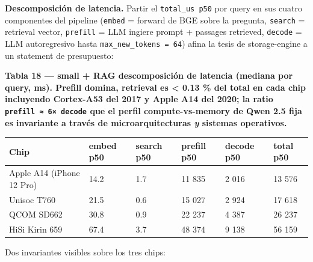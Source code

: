 \textbf{Descomposición de latencia.} Partir el \texttt{total\_us\ p50} por query
en sus cuatro componentes del pipeline (\texttt{embed} = forward de BGE sobre la
pregunta, \texttt{search} = retrieval vector, \texttt{prefill} = LLM ingiere
prompt + passages retrieved, \texttt{decode} = LLM autoregresivo hasta
\texttt{max\_new\_tokens\ =\ 64}) afina la tesis de storage-engine a un
statement de presupuesto:

\textbf{Tabla 18 --- small + RAG descomposición de latencia (mediana por query,
ms). Prefill domina, retrieval es \textless{} 0.13 \% del total en cada chip
incluyendo Cortex-A53 del 2017 y Apple A14 del 2020; la ratio
\texttt{prefill\ ≈\ 6×\ decode} que el perfil compute-vs-memory de Qwen 2.5 fija
es invariante a través de microarquitecturas \emph{y} sistemas operativos.}

{\def\LTcaptype{none} %
\begin{longtable}[]{@{}llllll@{}}
\toprule\noalign{}
Chip & embed p50 & search p50 & prefill p50 & decode p50 & total p50 \\
\midrule\noalign{}
\endhead
\bottomrule\noalign{}
\endlastfoot
Apple A14 (iPhone 12 Pro) & 14.2 & 1.7 & 11 835 & 2 016 & 13 576 \\
Unisoc T760 & 21.5 & 0.6 & 15 027 & 2 924 & 17 618 \\
QCOM SD662 & 30.8 & 0.9 & 22 237 & 4 387 & 26 237 \\
HiSi Kirin 659 & 67.4 & 3.7 & 48 374 & 9 138 & 56 159 \\
\end{longtable}
}

Dos invariantes visibles sobre los tres chips:

